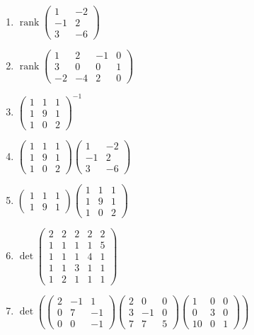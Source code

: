 \documentclass[11pt,a4paper]{article}
\begin{document}
\begin{enumerate}
\item $\displaystyle \operatorname{rank} \begin{pmatrix} 1 & -2 \\ -1 & 2 \\ 3 & -6 \end{pmatrix}$
\item $\displaystyle \operatorname{rank} \begin{pmatrix} 1 & 2 & -1 & 0 \\ 3 & 0 & 0 & 1 \\ -2 & -4 & 2 & 0 \end{pmatrix}$
\item $\displaystyle \begin{pmatrix} 1 & 1 & 1 \\ 1 & 9 & 1 \\ 1 & 0 & 2 \end{pmatrix}^{-1}$
\item $\displaystyle \begin{pmatrix} 1 & 1 & 1 \\ 1 & 9 & 1 \\ 1 & 0 & 2 \end{pmatrix} \begin{pmatrix} 1 & -2 \\ -1 & 2 \\ 3 & -6 \end{pmatrix}$
\item $\displaystyle \begin{pmatrix} 1 & 1 & 1 \\ 1 & 9 & 1 \end{pmatrix} \begin{pmatrix} 1 & 1 & 1 \\ 1 & 9 & 1 \\ 1 & 0 & 2 \end{pmatrix}$
\item $\displaystyle \det \begin{pmatrix} 2 & 2 & 2 & 2 & 2 \\ 1 & 1 & 1 & 1 & 5 \\ 1 & 1 & 1 & 4 & 1 \\ 1 & 1 & 3 & 1 & 1 \\ 1 & 2 & 1 & 1 & 1 \end{pmatrix}$
\item $\displaystyle \det\left( \begin{pmatrix} 2 & -1 & 1 \\ 0 & 7 & -1 \\ 0 & 0 & -1 \end{pmatrix} \begin{pmatrix} 2 & 0 & 0 \\ 3 & -1 & 0 \\ 7 & 7 & 5 \end{pmatrix} \begin{pmatrix} 1 & 0 & 0 \\ 0 & 3 & 0 \\ 10 & 0 & 1 \end{pmatrix} \right)$

\end{enumerate}
\end{document}
